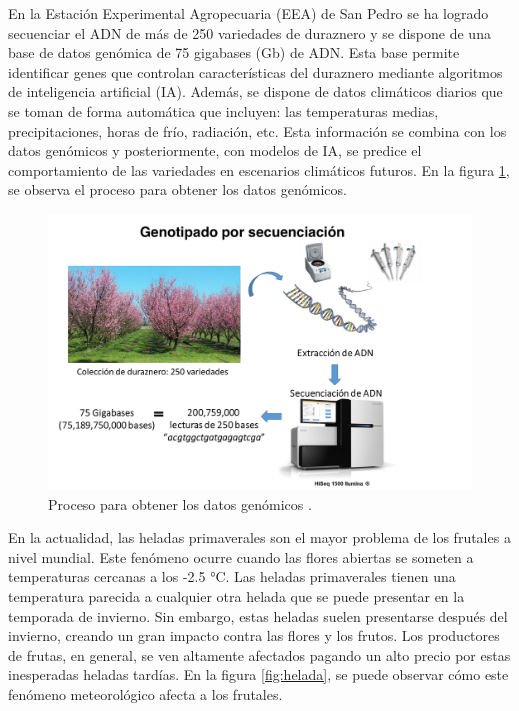 En la  Estación Experimental Agropecuaria (EEA) de San Pedro se ha logrado secuenciar el ADN de más de 250 variedades de duraznero \cite{ARTICLE:1} y se dispone de una base de datos genómica de 75 gigabases (Gb) de ADN. Esta base permite identificar genes que controlan características del duraznero mediante algoritmos de inteligencia artificial (IA). Además, se dispone de datos climáticos diarios que se toman de forma automática que incluyen: las temperaturas medias, precipitaciones, horas de frío, radiación, etc. Esta información se combina con los datos genómicos y posteriormente, con modelos de IA, se predice el comportamiento de las variedades en escenarios climáticos futuros. En la figura \ref{fig:genotipado}, se observa el proceso para obtener los datos genómicos.

\begin{figure}[h]
	\centering
	\includegraphics[scale=.3]{./Figures/genotipado.png}
	\caption{Proceso para obtener los datos genómicos \cite{ARTICLE:1}.}
	\label{fig:genotipado}
\end{figure}
\newpage
En la actualidad, las heladas primaverales son el mayor problema de los frutales a nivel mundial. Este fenómeno ocurre cuando las flores abiertas se someten a temperaturas cercanas a los -2.5 °C. Las heladas primaverales tienen una temperatura parecida a cualquier otra helada que se puede presentar en la temporada de invierno. Sin embargo, estas heladas suelen presentarse después del invierno, creando un gran impacto contra las flores y los frutos. Los productores de frutas, en general, se ven altamente afectados pagando un alto precio por estas inesperadas heladas tardías. En la figura \ref{fig:helada}, se puede observar cómo este fenómeno meteorológico afecta a los frutales.

